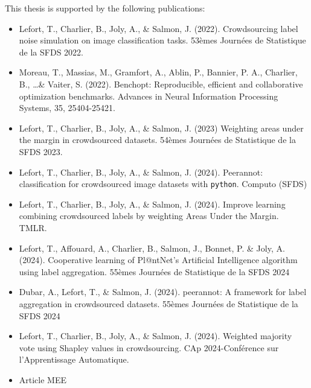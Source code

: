 This thesis is supported by the following publications:
\begin{itemize}
    \item Lefort, T., Charlier, B., Joly, A., \& Salmon, J. (2022). Crowdsourcing label noise simulation on image classification tasks. 53èmes Journées de Statistique de la SFDS 2022.
    \item Moreau, T., Massias, M., Gramfort, A., Ablin, P., Bannier, P. A., Charlier, B., \dots \& Vaiter, S. (2022). Benchopt: Reproducible, efficient and collaborative optimization benchmarks. Advances in Neural Information Processing Systems, 35, 25404-25421.
    \item Lefort, T., Charlier, B., Joly, A., \& Salmon, J. (2023) Weighting areas under the margin in crowdsourced datasets. 54èmes Journées de Statistique de la SFDS 2023.
    \item Lefort, T., Charlier, B., Joly, A., \& Salmon, J. (2024). Peerannot: classification for crowdsourced image datasets with \texttt{python}. Computo (SFDS)
    \item Lefort, T., Charlier, B., Joly, A., \& Salmon, J. (2024). Improve learning combining crowdsourced labels by weighting Areas Under the Margin. TMLR.
    \item Lefort, T., Affouard, A., Charlier, B., Salmon, J., Bonnet, P. \& Joly, A. (2024). Cooperative learning of Pl@ntNet's Artificial Intelligence algorithm using label aggregation. 55èmes Journées de Statistique de la SFDS 2024
    \item Dubar, A., Lefort, T., \& Salmon, J. (2024). peerannot: A framework for label aggregation in crowdsourced datasets. 55èmes Journées de Statistique de la SFDS 2024
    \item Lefort, T., Charlier, B., Joly, A., \& Salmon, J. (2024). Weighted majority vote using Shapley values in crowdsourcing. CAp 2024-Conférence sur l'Apprentissage Automatique.
    \item Article MEE
\end{itemize}

